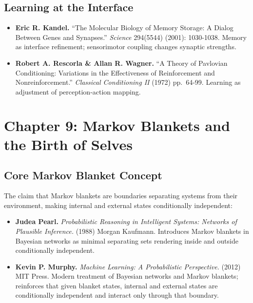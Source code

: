 \documentclass[
  openright]{book}
\begin{document}
\subsection{Learning at the Interface}\label{learning-at-the-interface}

\begin{itemize}
\item
  \textbf{Eric R. Kandel.} ``The Molecular Biology of Memory Storage: A
  Dialog Between Genes and Synapses.'' \emph{Science} 294(5544) (2001):
  1030-1038. Memory as interface refinement; sensorimotor coupling
  changes synaptic strengths.
\item
  \textbf{Robert A. Rescorla \& Allan R. Wagner.} ``A Theory of
  Pavlovian Conditioning: Variations in the Effectiveness of
  Reinforcement and Nonreinforcement.'' \emph{Classical Conditioning II}
  (1972) pp.~64-99. Learning as adjustment of perception-action mapping.
\end{itemize}

\section{Chapter 9: Markov Blankets and the Birth of
Selves}\label{chapter-9-markov-blankets-and-the-birth-of-selves}

\subsection{Core Markov Blanket
Concept}\label{core-markov-blanket-concept}

The claim that Markov blankets are boundaries separating systems from
their environment, making internal and external states conditionally
independent:

\begin{itemize}
\item
  \textbf{Judea Pearl.} \emph{Probabilistic Reasoning in Intelligent
  Systems: Networks of Plausible Inference.} (1988) Morgan Kaufmann.
  Introduces Markov blankets in Bayesian networks as minimal separating
  sets rendering inside and outside conditionally independent.
\item
  \textbf{Kevin P. Murphy.} \emph{Machine Learning: A Probabilistic
  Perspective.} (2012) MIT Press. Modern treatment of Bayesian networks
  and Markov blankets; reinforces that given blanket states, internal
  and external states are conditionally independent and interact only
  through that boundary.
\end{itemize}
\end{document}
